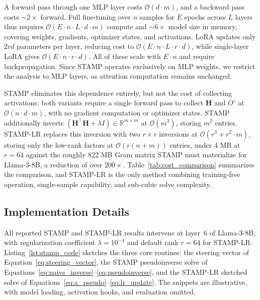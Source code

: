 A forward pass through one MLP layer costs $\mathcal{O}(d \cdot m)$, and a backward pass costs ${\sim}2\times$ forward. Full fine-tuning over $n$ samples for $E$ epochs across $L$ layers thus requires $\mathcal{O}(E \cdot n \cdot L \cdot d \cdot m)$ compute and ${\sim}6\times$ model size in memory, covering weights, gradients, optimizer states, and activations. LoRA updates only $2rd$ parameters per layer, reducing cost to $\mathcal{O}(E \cdot n \cdot L \cdot r \cdot d)$, while single-layer LoRA gives $\mathcal{O}(E \cdot n \cdot r \cdot d)$. All of these scale with $E \cdot n$ and require backpropagation. Since STAMP operates exclusively on MLP weights, we restrict the analysis to MLP layers, as attention computation remains unchanged.

STAMP eliminates this dependence entirely, but not the cost of collecting activations: both variants require a single forward pass to collect $\mathbf{H}$ and $O'$ at $\mathcal{O}(n \cdot d \cdot m)$, with no gradient computation or optimizer states. STAMP additionally inverts $(\mathbf{H}^\top \mathbf{H} + \lambda I) \in \mathbb{R}^{m \times m}$ at $\mathcal{O}(m^3)$, storing $m^2$ entries. STAMP-LR replaces this inversion with two $r \times r$ inversions at $\mathcal{O}(r^3 + r^2 \cdot m)$, storing only the low-rank factors at $\mathcal{O}(r(n+m))$ entries, under 4 MB at $r=64$ against the roughly 822 MB Gram matrix STAMP must materialize for Llama-3-8B, a reduction of over $200\times$. Table~\ref{tab:cost_comparison} summarizes the comparison, and STAMP-LR is the only method combining training-free operation, single-sample capability, and sub-cubic solve complexity.

\subsection{Implementation Details}\label{subsec:rp_implementation}

All reported STAMP and STAMP-LR results intervene at layer~6 of Llama-3-8B, with regularization coefficient $\lambda = 10^{-4}$ and default rank $r = 64$ for STAMP-LR. Listing~\ref{lst:stamp_code} sketches the three core routines: the steering vector of Equation~\ref{eq:steering_vector}, the STAMP pseudoinverse solve of Equations~\ref{eq:naive_inverse}--\ref{eq:pseudoinverse}, and the STAMP-LR sketched solve of Equations~\ref{eq:a_pseudo}--\ref{eq:lr_update}. The snippets are illustrative, with model loading, activation hooks, and evaluation omitted.


